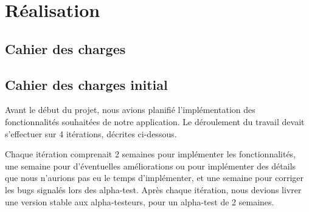 \documentclass[a4paper,11pt,french]{article}
\begin{document}
\section{Réalisation}
\subsection{Cahier des charges}

\subsection{Cahier des charges initial}
Avant le début du projet, nous avions planifié l'implémentation des fonctionnalités souhaitées de notre application. Le déroulement du
travail devait s'effectuer sur 4 itérations, décrites ci-dessous.

Chaque itération comprenait 2 semaines pour implémenter les fonctionnalités, une semaine pour d'éventuelles améliorations ou pour
implémenter des détails que nous n'aurions pas eu le temps d'implémenter, et une semaine pour corriger les bugs signalés lors des
alpha-test. Après chaque itération, nous devions livrer une version stable aux alpha-testeurs, pour un alpha-test de 2 semaines.
\end{document}
